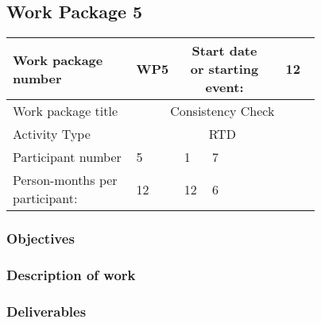 \subsection{Work Package 5}

\begin{table}[hbpt]\centering
	\begin{tabular}{|p{0.35\linewidth}|p{0.06\linewidth}|p{0.06\linewidth}|p{0.06\linewidth}|
         p{0.06\linewidth}|p{0.06\linewidth}|p{0.06\linewidth}|p{0.06\linewidth}|}\hline
		 Work package number& WP5 &
		 \multicolumn{4}{|c|}{Start date or starting event:}{}&
		 \multicolumn{2}{|c|}{ 12 }{}\\\hline
		 Work package title&\multicolumn{7}{|c|}{ Consistency Check }{}\\\hline
		 Activity Type&\multicolumn{7}{|c|}{ RTD}{}\\\hline
		 Participant number & 5 & 1 & 7 & ~ & ~ & ~ & ~ \\\hline
		 Person-months per participant: & 12 & 12 & 6 & ~ & ~ & ~ & ~ \\\hline
	\end{tabular}
\end{table}

\subsubsection{Objectives}

\subsubsection{Description of work}

\subsubsection{Deliverables}